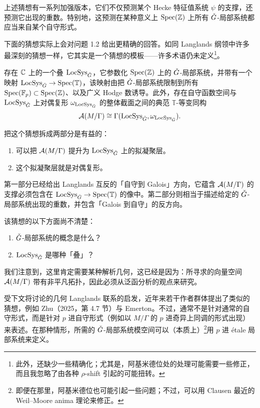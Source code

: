 上述猜想有一系列加强版本，它们不仅预测某个 Hecke 特征值系统 $\psi$ 的支撑，还预测它出现的重数。特别地，这预测在某种意义上 $\operatorname{Spec}(\mathbb{Z})$ 上所有 $\check{G}$-局部系统都应当来自某个自守形式。

下面的猜想实际上会对问题 1.2 给出更精确的回答。如同 Langlands 纲领中许多最深刻的猜想一样，它其实是一个猜想的模板——许多术语仍未定义\footnote{此外，还缺少一些精确化；尤其是，阿基米德位处的处理可能需要一些修正，而且我忽略了由各种 $\rho$-shift 引起的可能扭转。}。

\begin{conjecture}
存在 $\mathbb{C}$ 上的一个叠 $\operatorname{LocSys}_{\check{G}}$，它参数化 $\operatorname{Spec}(\mathbb{Z})$ 上的 $\check{G}$-局部系统，并带有一个映射 $\operatorname{LocSys}_{\check{G}}\to\operatorname{Spec}(\mathbb{T})$，该映射由把 $\check{G}$-局部系统限制到所有 $\operatorname{Spec}(\mathbb{F}_{p})\subset\operatorname{Spec}(\mathbb{Z})$、以及广义 Hodge 数诱导。此外，存在自守函数空间与 $\operatorname{LocSys}_{\check{G}}$ 上对偶复形 $\omega_{\operatorname{LocSys}_{\check{G}}}$ 的整体截面之间的典范 $\mathbb{T}$-等变同构
\[ \mathcal{A}(M/\Gamma)\cong\Gamma(\operatorname{LocSys}_{\check{G}},\omega_{\operatorname{LocSys}_{\check{G}}}). \]
\end{conjecture}

把这个猜想拆成两部分是有益的：
\begin{enumerate}
\item 可以把 $\mathcal{A}(M/\Gamma)$ 提升为 $\operatorname{LocSys}_{\check{G}}$ 上的拟凝聚层。
\item 这个拟凝聚层就是对偶复形。
\end{enumerate}
第一部分已经给出 Langlands 互反的「自守到 Galois」方向，它蕴含 $\mathcal{A}(M/\Gamma)$ 的支撑必须包含在 $\operatorname{LocSys}_{\check{G}}\to\operatorname{Spec}(\mathbb{T})$ 的像中。第二部分则相当于描述给定的 $\check{G}$-局部系统出现的重数，并包含「Galois 到自守」的反方向。

\begin{remark}
该猜想的以下方面尚不清楚：

\begin{enumerate}
\item $\check{G}$-局部系统的概念是什么？
\item $\operatorname{LocSys}_{\check{G}}$ 是哪种「叠」？
\end{enumerate}
我们注意到，这里肯定需要某种解析几何，这已经是因为：所寻求的向量空间 $\mathcal{A}(M/\Gamma)$ 带有非平凡拓扑，因此必须从泛函分析的观点来研究。
\end{remark}

受下文将讨论的几何 Langlands 联系的启发，近年来若干作者群体提出了类似的猜想，例如 Zhu（2025，第 4.7 节）与 Emerton。不过，通常不是针对通常的自守形式，而是针对 $p$ 进自守形式（例如以 $M/\Gamma$ 的 $p$ 进奇异上同调的形式出现）来表述。在那种情形，所需的 $\check{G}$-局部系统模空间可以（本质上）\footnote{即便在那里，阿基米德位也可能引起一些问题；不过，可以用 Clausen 最近的 Weil–Moore anima 理论来修正。}用 $p$ 进 étale 局部系统来定义。

